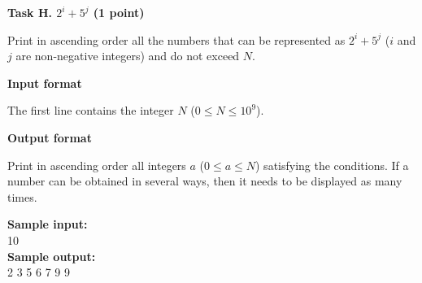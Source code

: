 \documentclass[a4paper]{article}
\begin{document}
\textbf{Task H. $2^i + 5^j$ (1 point)}

\SPACE

Print in ascending order all the numbers that can be represented as $2^i + 5^j$ ($i$ and $j$ are non-negative integers) and do not exceed $N$.

\SPACE

\textbf{Input format}

The first line contains the integer $N$ ($0 \le N \le 10^9$).

\SPACE

\textbf{Output format}

Print in ascending order all integers $a$ ($0 \le a \le N$) satisfying the conditions. If a number can be obtained in several ways, then it needs to be displayed as many times.

\SPACE

\noindent \textbf{Sample input:}\\
10\\


\noindent \textbf{Sample output:}\\
2 3 5 6 7 9 9\\
\end{document}
